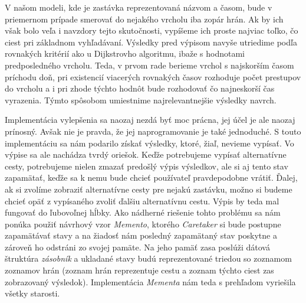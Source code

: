 V našom modeli, kde je zastávka reprezentovaná názvom a časom, bude v priemernom prípade smerovať do nejakého vrcholu iba zopár hrán. Ak by ich však bolo veľa i navzdory tejto skutočnosti, vypíšeme ich proste najviac toľko, čo ciest pri základnom vyhľadávaní. Výsledky pred výpisom navyše utriedime podľa rovnakých kritérií ako u Dijkstrovho algoritmu, ibaže s hodnotami predposledného vrcholu. Teda, v prvom rade berieme vrchol s najskorším časom príchodu doň, pri existencií viacerých rovnakých časov rozhoduje počet prestupov do vrcholu a i pri zhode týchto hodnôt bude rozhodovať čo najneskorší čas vyrazenia. Týmto spôsobom umiestnime najrelevantnejšie výsledky navrch.\newline

Implementácia vylepšenia sa naozaj nezdá byť moc prácna, jej účel je ale naozaj prínosný. Avšak nie je pravda, že jej naprogramovanie je také jednoduché. S touto implementáciu sa nám podarilo získať výsledky, ktoré, žiaľ, nevieme vypísať. Vo výpise sa ale nachádza tvrdý oriešok. Keďže potrebujeme vypísať alternatívne cesty, potrebujeme nielen zmazať predošlý výpis výsledkov, ale si aj tento stav zapamätať, keďže sa k nemu bude chcieť používateľ pravdepodobne vrátiť. Ďalej, ak si zvolíme zobraziť alternatívne cesty pre nejakú zastávku, možno si budeme chcieť opäť z vypísaného zvoliť ďalšiu alternatívnu cestu. Výpis by teda mal fungovať do ľubovoľnej hĺbky. Ako nádherné riešenie tohto problému sa nám ponúka použiť návrhový vzor \textit{Memento}, ktorého \textit{Caretaker} si bude postupne zapamätávať stavy a na žiadosť nám posledný zapamätaný stav poskytne a zároveň ho odstráni zo svojej pamäte. Na jeho pamäť zasa poslúži dátová štruktúra \textit{zásobník} a ukladané stavy budú reprezentované triedou so zoznamom zoznamov hrán (zoznam hrán reprezentuje cestu a zoznam týchto ciest zas zobrazovaný výsledok). Implementácia \textit{Mementa} nám teda s prehľadom vyriešila všetky starosti.\newline

